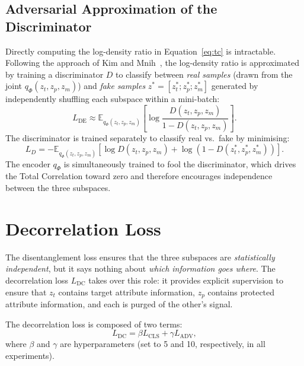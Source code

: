 \subsection{Adversarial Approximation of the Discriminator}

Directly computing the log-density ratio in Equation~\eqref{eq:tc} is intractable. Following the
approach of Kim and Mnih~\cite{kim2018factorVAE}, the log-density ratio is approximated by training
a discriminator $D$ to classify between \emph{real samples} (drawn from the joint $q_\Phi(z_t, z_p, z_m)$)
and \emph{fake samples} $z^* = [z_t^*; z_p^*; z_m^*]$ generated by independently shuffling each
subspace within a mini-batch:
\begin{equation}
    L_\text{DE} \approx \mathbb{E}_{q_\Phi(z_t, z_p, z_m)}\!\left[
        \log \frac{D(z_t, z_p, z_m)}{1 - D(z_t, z_p, z_m)}
    \right].
    \label{eq:tc-approx}
\end{equation}
The discriminator is trained separately to classify real vs.\ fake by minimising:
\begin{equation}
    L_D = -\mathbb{E}_{q_\Phi(z_t, z_p, z_m)}\!\left[
        \log D(z_t, z_p, z_m) + \log\!\left(1 - D(z_t^*, z_p^*, z_m^*)\right)
    \right].
    \label{eq:disc-loss}
\end{equation}
The encoder $q_\Phi$ is simultaneously trained to fool the discriminator, which drives the Total
Correlation toward zero and therefore encourages independence between the three subspaces.

\section{Decorrelation Loss}
\label{sec:readme-decorrelation}

The disentanglement loss ensures that the three subspaces are \emph{statistically independent}, but
it says nothing about \emph{which information goes where}. The decorrelation loss $L_\text{DC}$
takes over this role: it provides explicit supervision to ensure that $z_t$ contains target
attribute information, $z_p$ contains protected attribute information, and each is purged of the
other's signal.

The decorrelation loss is composed of two terms:
\begin{equation}
    L_\text{DC} = \beta L_\text{CLS} + \gamma L_\text{ADV},
    \label{eq:dc}
\end{equation}
where $\beta$ and $\gamma$ are hyperparameters (set to 5 and 10, respectively, in all experiments).

